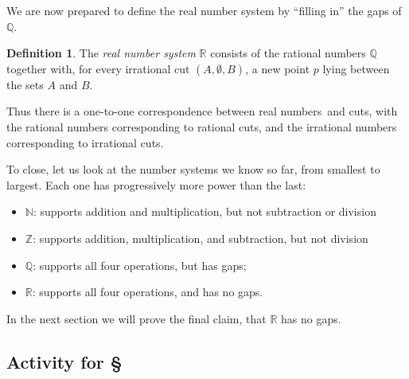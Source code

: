 \documentclass[11pt,oneside]{amsbook}
\newcommand{\set}[1]{\left\{\,#1\,\right\}}
\newcommand{\N}{\mathbb N}
\newcommand{\Z}{\mathbb Z}
\newcommand{\Q}{\mathbb Q}
\newcommand{\R}{\mathbb R}
\theoremstyle{definition}
\theoremstyle{plain}
\theoremstyle{definition}
\newtheorem{definition}[theorem]{Definition}
\theoremstyle{remark}
\numberwithin{equation}{section}
\numberwithin{figure}{section}
\begin{document}
We are now prepared to define the real number system by ``filling in'' the gaps of $\Q$.

\begin{definition}
  The \emph{real number system} $\R$ consists of the rational numbers $\Q$ together with, for every irrational cut $(A,\emptyset,B)$, a new point $p$ lying between the sets $A$ and $B$.
\end{definition}

Thus there is a one-to-one correspondence between real numbers and cuts, with the rational numbers corresponding to rational cuts, and the irrational numbers corresponding to irrational cuts.

To close, let us look at the number systems we know so far, from smallest to largest. Each one has progressively more power than the last:
\begin{itemize}
  \item $\N$: supports addition and multiplication, but not subtraction or division
  \item $\Z$: supports addition, multiplication, and subtraction, but not division
  \item $\Q$: supports all four operations, but has gaps;
  \item $\R$: supports all four operations, and has no gaps.
\end{itemize}
In the next section we will prove the final claim, that $\R$ has no gaps.


\newpage
\subsection*{Activity for \S \thesection}
\end{document}
